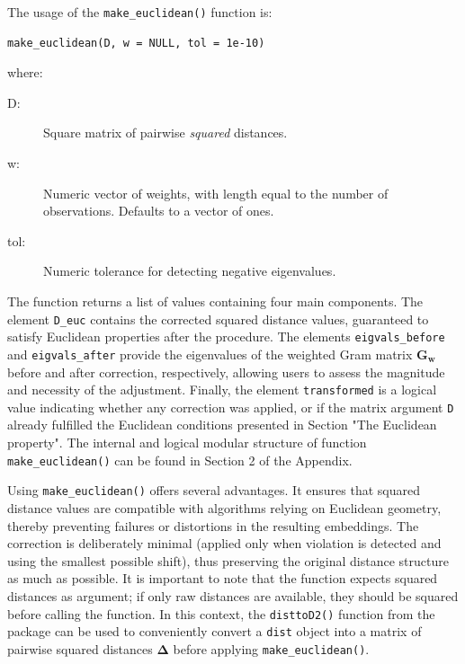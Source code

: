 The usage of the \texttt{make\_euclidean()} function is:

\begin{verbatim}
make_euclidean(D, w = NULL, tol = 1e-10)
\end{verbatim}

where:

\begin{description}
\item[D:] Square matrix of pairwise \emph{squared} distances.
\item[w:] Numeric vector of weights, with length equal to the number of observations. Defaults to a vector of ones.
\item[tol:] Numeric tolerance for detecting negative eigenvalues.
\end{description}

The function returns a list of values containing four main components. The element \texttt{D\_euc} contains the corrected squared distance values, guaranteed to satisfy Euclidean properties after the procedure. The elements \texttt{eigvals\_before} and \texttt{eigvals\_after} provide the eigenvalues of the weighted Gram matrix $\mathbf{G}_{\mathbf{w}}$ before and after correction, respectively, allowing users to assess the magnitude and necessity of the adjustment. Finally, the element \texttt{transformed} is a logical value indicating whether any correction was applied, or if the matrix argument \texttt{D} already fulfilled the Euclidean conditions presented in Section "The Euclidean property".
The internal and logical modular structure of function \texttt{make\_euclidean()} can be found in Section 2
of the Appendix.

Using \texttt{make\_euclidean()} offers several advantages. It ensures that squared distance values are compatible with algorithms relying on Euclidean geometry, thereby preventing failures or distortions in the resulting embeddings. The correction is deliberately minimal (applied only when violation is detected and using the smallest possible shift), thus preserving the original distance structure as much as possible. It is important to note that the function expects squared distances as argument; if only raw distances are available, they should be squared before calling the function. In this context, the \texttt{disttoD2()} function from the  package can be used to conveniently convert a \texttt{dist} object into a matrix of pairwise squared distances $\mathbf{\Delta}$ before applying \texttt{make\_euclidean()}.

